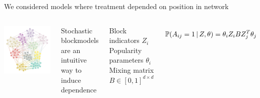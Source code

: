 \documentclass[aspectratio=169]{beamer}
\newcommand{\Z}{Z}
\renewcommand{\P}[2][]{%
	\ifthenelse{ \equal{#1}{} }
	{\ensuremath{\mathbb{P} \paren*{#2}}}
	{\ensuremath{\mathbb{P} \paren*{#2 \, \middle \vert \, #1}}}
}
\DeclarePairedDelimiter{\paren}{(}{)}
\theoremstyle{remark}
\begin{document}
\begin{frame}{We considered models where treatment depended on position in network}
    
    \begin{columns}
        \centering
        \includegraphics[width=\textwidth]{./figures/assortative.png}
        
        Stochastic blockmodels are an intuitive way to induce dependence \\
        \vspace{4mm}
        
        Block indicators $Z_i$ \\
        Popularity parameters $\theta_i$ \\
        Mixing matrix $B \in [0, 1]^{d \times d}$
        
        \begin{equation*}
            \P[\Z, \theta]{A_{ij} = 1} = \theta_i Z_i B Z_j^T \theta_j
        \end{equation*}
    \end{columns}
\end{frame}
\end{document}
